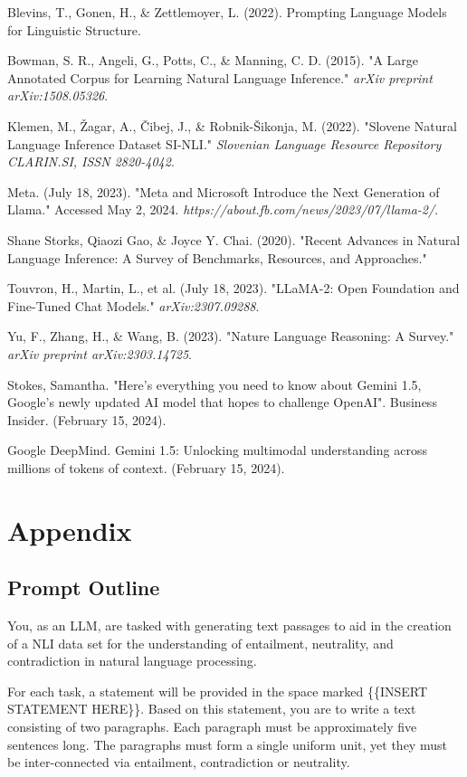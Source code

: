 \documentclass[fleqn,moreauthors,10pt]{ds_report}
\begin{document}
Blevins, T., Gonen, H., \& Zettlemoyer, L. (2022). Prompting Language Models for Linguistic Structure.

Bowman, S. R., Angeli, G., Potts, C., \& Manning, C. D. (2015). "A Large Annotated Corpus for Learning Natural Language Inference." \textit{arXiv preprint arXiv:1508.05326}.

Klemen, M., Žagar, A., Čibej, J., \& Robnik-Šikonja, M. (2022). "Slovene Natural Language Inference Dataset SI-NLI." \textit{Slovenian Language Resource Repository CLARIN.SI, ISSN 2820-4042}.

Meta. (July 18, 2023). "Meta and Microsoft Introduce the Next Generation of Llama." Accessed May 2, 2024. \allowbreak \textit{https://about.fb.com/news/2023/07/llama-2/}.

Shane Storks, Qiaozi Gao, \& Joyce Y. Chai. (2020). "Recent Advances in Natural Language Inference: A Survey of Benchmarks, Resources, and Approaches."

Touvron, H., Martin, L., et al. (July 18, 2023). "LLaMA-2: Open Foundation and Fine-Tuned Chat Models." \textit{arXiv:2307.09288}.

Yu, F., Zhang, H., \& Wang, B. (2023). "Nature Language Reasoning: A Survey." \textit{arXiv preprint arXiv:2303.14725}.

Stokes, Samantha. "Here's everything you need to know about Gemini 1.5, Google's newly updated AI model that hopes to challenge OpenAI". Business Insider.  (February 15, 2024). 

Google DeepMind. Gemini 1.5: Unlocking multimodal understanding across millions of tokens of context. (February 15, 2024). 
\vspace{\baselineskip}

\section*{Appendix}

\subsection{Prompt Outline}

You, as an LLM, are tasked with generating text passages to aid in the creation of a NLI data set for the understanding of entailment, neutrality, and contradiction in natural language processing.

For each task, a statement will be provided in the space marked \{\{INSERT STATEMENT HERE\}\}. Based on this statement, you are to write a text consisting of two paragraphs. Each paragraph must be approximately five sentences long. The paragraphs must form a single uniform unit, yet they must be inter-connected via entailment, contradiction or neutrality.
\end{document}
